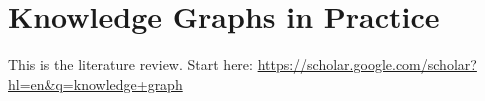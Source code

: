 \section{Knowledge Graphs in Practice}

This is the literature review. Start here: \url{https://scholar.google.com/scholar?hl=en&q=knowledge+graph}